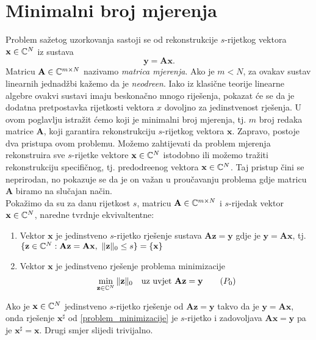 \documentclass[a4paper,twoside,12pt]{memoir} %
\newcommand{\vect}[1]{\mathbf{#1}}
\renewcommand{\vec}{\vect}
\newcommand{\norm}[1]{\|{#1}\|}
\begin{document}
\section[Minimalni broj mjerenja][Minimalni broj mjerenja]{Minimalni broj mjerenja}
Problem sa\v{z}etog uzorkovanja sastoji se od rekonstrukcije $s$-rijetkog vektora $\vec{x} \in \C^N$ iz sustava
\[\vec{y} = \vec{A}\vec{x}.\]
Matricu $\vec{A} \in \C^{m\times N}$ nazivamo \textit{matrica mjerenja}. Ako je $m < N$, za ovakav sustav linearnih jednad\v{z}bi ka\v{z}emo da je \textit{neodre\dj en}. Iako iz klasi\v{c}ne teorije linearne algebre ovakvi sustavi imaju beskona\v{c}no mnogo rije\v{s}enja, pokazat \'ce se da je dodatna pretpostavka rijetkosti vektora $x$ dovoljno za jedinstvenost rje\v{s}enja. U ovom poglavlju istra\v{z}it \'cemo koji je minimalni broj mjerenja, tj. $m$ broj redaka matrice $\vec{A}$, koji garantira rekonstrukciju $s$-rijetkog vektora $\vec{x}$. Zapravo, postoje dva pristupa ovom problemu. Mo\v{z}emo zahtijevati da problem mjerenja rekonstruira sve $s$-rijetke vektore $\vec{x} \in \C^N$ istodobno ili mo\v{z}emo tra\v{z}iti rekonstrukciju specifi\v{c}nog, tj. predodre\dj enog vektora $\vec{x} \in \C^N$. Taj pristup \v{c}ini se neprirodan, no pokazuje se da je on va\v{z}an u prou\v{c}avanju problema gdje matricu $\vec{A}$ biramo na slu\v{c}ajan na\v{c}in. \\ 
\indent Poka\v{z}imo da su za danu rijetkost $s$, matricu $\vec{A} \in \C^{m \times N}$ i $s$-rijedak vektor $\vec{x} \in \C^N$, naredne tvrdnje ekvivaltentne: 
\begin{enumerate}
    \item Vektor $\vec{x}$ je jedinstveno $s$-rijetko rje\v{s}enje sustava $\vec{A}\vec{z}=\vec{y}$ gdje je $\vec{y} = \vec{Ax}$, tj. $\{\vec{z} \in \C^N : \vec{A}\vec{z}= \vec{A}\vec{x},\ \norm{\vec{z}}_0 \leq s\} = \{\vec{x}\}$
    \item Vektor $\vec{x}$ je jedinstveno rje\v{s}enje problema minimizacije
        \begin{equation}\label{problem_minimizacije}
            \min\limits_{\vec{z} \in \C^N} \norm{\vec{z}}_0\quad \text{uz uvjet}\ \vec{Az} = \vec y \tag{$P_{0}$}
        \end{equation}
\end{enumerate}
Ako je $\vec{x} \in \C^N$ jedinstveno $s$-rijetko rje\v{s}enje od $\vec{Az} = \vec y$ takvo da je $\vec y = \vec{Ax}$, onda rje\v{s}enje $\vec x^{\sharp}$ od \eqref{problem_minimizacije} je $s$-rijetko i zadovoljava $\vec{Ax} = \vec y$ pa je $\vec x^\sharp = \vec x$. Drugi smjer slijedi trivijalno.
\end{document}
